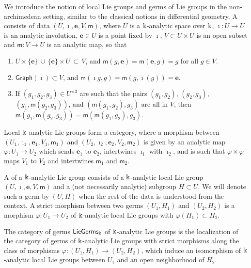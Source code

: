 \documentclass[twoside,leqno]{article}
\numberwithin{equation}{section}
\theoremstyle{plain}
\theoremstyle{definition}
\begin{document}
We introduce the notion of local Lie groups and germs of Lie groups in the non-archimedean setting, similar to the classical notions in differential geometry.
A  consists of data $(U,\imath,\mathbf{e},V,\mathsf{m})$, where $U$ is a $\Bbbk$-analytic space over $\Bbbk$, $\imath \colon U \to U$ is an analytic involution, $\mathbf{e} \in U$ is a point fixed by $\imath$, $V \subset U\times U$ is an open
subset and $\mathsf{m} \colon V \to U$ is an analytic map, so that
\begin{enumerate}
\item $U\times \{\mathbf{e}\} \, \cup \, \{\mathbf{e}\}\times U \, \subset \, V$, and $\mathsf{m}(g,\mathbf{e}) = \mathsf{m}(\mathbf{e},g) = g$ for all $g \in V$.
\item $\mathsf{Graph}(\imath) \subset V$, and $\mathsf{m}(\imath{g},g) = \mathsf{m}(g,\imath(g)) = \mathbf{e}$.
\item If $(g_{1},g_{2},g_{3}) \in U^{\times 3}$ are such that the pairs  $(g_{1},g_{2})$, $(g_{2},g_{3})$, $(g_{1},\mathsf{m}(g_{2},g_{3}))$, and $(\mathsf{m}(g_{1},g_{2}),g_{3})$ are all in $V$, then $\mathsf{m}(g_{1},\mathsf{m}(g_{2},g_{3})) = \mathsf{m}(\mathsf{m}(g_{1},g_{2}),g_{3})$.
\end{enumerate}
Local $\Bbbk$-analytic Lie groups form a category, where a morphism between 
$(U_{1},\imath_{1},\mathbf{e}_{1},V_{1},\mathsf{m}_{1})$ and $(U_{2},\imath_{2},\mathbf{e}_{2},V_{2},\mathsf{m}_{2})$ is given by
an analytic map $\varphi \colon U_{1}\to U_{2}$ which sends $\mathbf{e}_{1}$ to $\mathbf{e}_{2}$, intertwines $\imath_{1}$
with $\imath_{2}$, and is such that $\varphi\times \varphi$ maps $V_{1}$ to $V_{2}$ and intertwines $\mathsf{m}_{1}$ and $\mathsf{m}_{2}$.


A  of a $\Bbbk$-analytic Lie group consists of a $\Bbbk$-analytic local Lie group $(U,\imath,\mathbf{e},V,\mathsf{m})$ and a (not necessarily analytic)  subgroup $H \subset U$. We will denote such a germ by $(U,H)$ when the rest of the data is understood from the context. A strict morphism between two germs $(U_{1},H_{1})$ and $(U_{2},H_{2})$ is a morphism $\varphi\colon U_{1}\to U_{2}$ of $\Bbbk$-analytic local Lie groups with $\varphi(H_{1})\subset H_{2}$. 

The category of germs $\mathsf{LieGerms}_\Bbbk$ of $\Bbbk$-analytic Lie groups is  the localization of the category of germs of $\Bbbk$-analytic Lie groups with strict morphisms along the class of morphisms  \linebreak $\varphi\colon (U_{1},H_{1})\to (U_{2},H_{2})$, which induce an isomorphism of $\Bbbk$-analytic local Lie groups between $U_{1}$ and an open neighborhood of $H_{2}$.
\end{document}
